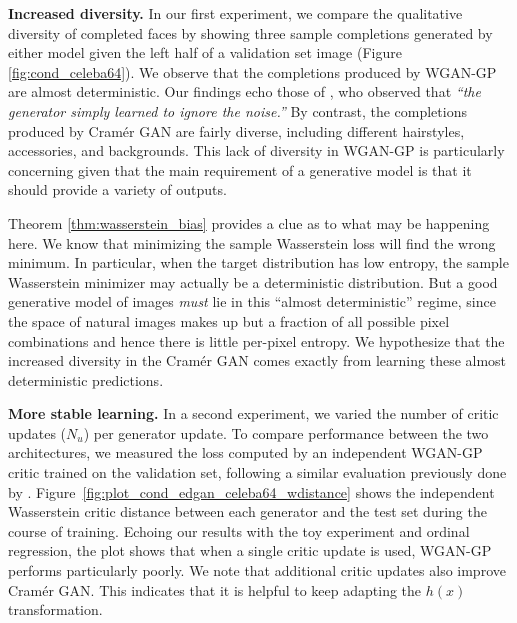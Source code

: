 \documentclass{article}
\begin{document}
\textbf{Increased diversity.} In our first experiment, we compare the qualitative diversity of completed faces by showing three sample completions generated by either model given the left half of a validation set image (Figure \ref{fig:cond_celeba64}). We observe that the completions produced by WGAN-GP are almost deterministic. Our findings echo those of \citet{isola2016image}, who observed that \emph{``the generator simply learned to ignore the noise.''} By contrast, the completions produced by Cram\'er GAN are fairly diverse, including different hairstyles, accessories, and backgrounds. This lack of diversity in WGAN-GP is particularly concerning given that the main requirement of a generative model is that it should provide a variety of outputs.
  
Theorem \ref{thm:wasserstein_bias} provides a clue as to what may be happening here. We know that minimizing the sample Wasserstein loss will find the wrong minimum. In particular, when the target distribution has low entropy, the sample Wasserstein minimizer may actually be a deterministic distribution. But a good generative model of images \emph{must} lie in this ``almost deterministic'' regime, since the space of natural images makes up but a fraction of all possible pixel combinations and hence there is little per-pixel entropy. We hypothesize that the increased diversity in the Cram\'er GAN comes exactly from learning these almost deterministic predictions.

\textbf{More stable learning.}
In a second experiment, we varied the number of critic updates ($N_u$) per generator update.
To compare performance between the two architectures, we measured the loss computed by an independent WGAN-GP critic trained on the validation set, following a similar evaluation previously done by \citet{ivogan}.
%
Figure~\ref{fig:plot_cond_edgan_celeba64_wdistance} shows the independent Wasserstein critic distance between each generator and the test set during the course of training. Echoing our results with the toy experiment and ordinal regression, the plot shows that when a single critic update is used, WGAN-GP performs particularly poorly. We note that additional critic updates also improve Cram\'er GAN. This indicates that it is helpful to keep adapting the $h(x)$ transformation.
\end{document}
